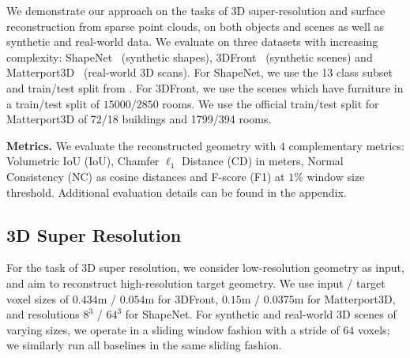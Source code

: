 We demonstrate our approach on the tasks of 3D super-resolution and surface reconstruction from sparse point clouds, on both objects and scenes as well as synthetic and real-world data.
%
We evaluate on three datasets with increasing complexity: ShapeNet~\cite{chang2015shapenet} (synthetic shapes), 3DFront~\cite{fu20203dfront} (synthetic scenes) and Matterport3D~\cite{chang2017matterport3d} (real-world 3D scans).
%
For ShapeNet, we use the 13 class subset and train/test split from \cite{choy20163d}. 
%
For 3DFront, we use the scenes which have furniture in a train/test split of $15000/2850$ rooms.
%
We use the official train/test split for Matterport3D of 72/18 buildings and 1799/394 rooms.

\smallskip
\noindent \textbf{Metrics.}
We evaluate the reconstructed geometry with $4$ complementary metrics: Volumetric IoU (IoU), Chamfer $\ell_1$ Distance (CD) in meters, Normal Consistency (NC) as cosine distances and F-score (F1) at $1\%$ window size threshold. 
Additional evaluation details can be found in the appendix.

\subsection{3D Super Resolution}
For the task of 3D super resolution, we consider low-resolution geometry as input, and aim to reconstruct high-resolution target geometry.
%
We use input / target voxel sizes of $0.434$m / $0.054$m for 3DFront, $0.15$m / $0.0375$m for Matterport3D, and resolutions $8^3$ / $64^3$ for ShapeNet.
%
For synthetic and real-world 3D scenes of varying sizes, we operate in a sliding window fashion with a stride of $64$ voxels; we similarly run all baselines in the same sliding fashion.


